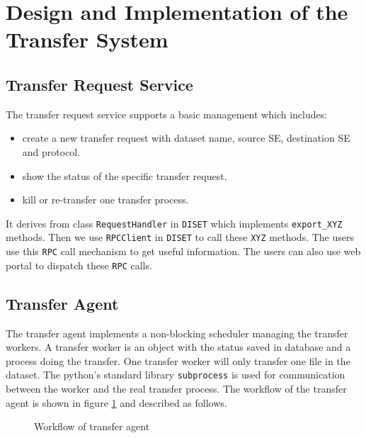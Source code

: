 \section{Design and Implementation of the Transfer System}

\subsection{Transfer Request Service}

The transfer request service supports a basic management which includes:
\begin{itemize}
    \item create a new transfer request with dataset name,
          source SE, destination SE and protocol.
    \item show the status of the specific transfer request.
    \item kill or re-transfer one transfer process.
\end{itemize}
It derives from class {\tt RequestHandler} in {\tt DISET}
which implements \verb"export_XYZ" methods.
Then we use {\tt RPCClient} in {\tt DISET} to call these \verb"XYZ"
methods. The users use this {\tt RPC} call mechanism to get useful
information. The users can also use web portal to dispatch these
{\tt RPC} calls.
%
\subsection{Transfer Agent}
%
The transfer agent implements a non-blocking scheduler 
managing the transfer workers. A transfer worker is an object with
the status saved in database and a process doing the transfer.
One transfer worker will only transfer one file in the dataset.
The python's standard library {\tt subprocess} is used for communication
between the worker and the real transfer process.
%
The workflow of the transfer agent is shown in figure \ref{fig:agent}
and described as follows.
\begin{figure}[htbp]
    
    \caption{Workflow of transfer agent} \label{fig:agent}
\end{figure}

